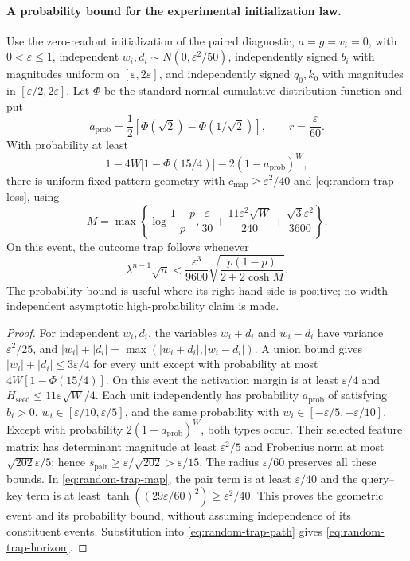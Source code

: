 \paragraph{A probability bound for the experimental initialization law.}
\begin{corollary}
\label{cor:random-trap-geometry}
Use the zero-readout initialization of the paired diagnostic, $a=g=v_i=0$, with $0<\varepsilon\le1$,
independent $w_i,d_i\sim N(0,\varepsilon^2/50)$, independently signed
$b_i$ with magnitudes uniform on $[\varepsilon,2\varepsilon]$, and independently
signed $q_0,k_0$ with magnitudes in $[\varepsilon/2,2\varepsilon]$.
Let $\Phi$ be the standard normal cumulative distribution function and put
\[
 a_{\mathrm{prob}}=\frac12\left[\Phi(\sqrt2)-\Phi(1/\sqrt2)\right],
 \qquad r=\frac\varepsilon{60}.
\]
With probability at least
\begin{equation}
 1-4W\bigl[1-\Phi(15/4)\bigr]-2(1-a_{\mathrm{prob}})^W,
 \label{eq:random-trap-probability}
\end{equation}
there is uniform fixed-pattern geometry with
$c_{\mathrm{map}}\ge\varepsilon^2/40$ and \cref{eq:random-trap-loss}, using
\[
 M=\max\left\{\log\frac{1-p}{p},
 \frac\varepsilon{30}+\frac{11\varepsilon^2\sqrt W}{240}
                   +\frac{\sqrt3\varepsilon^2}{3600}\right\}.
\]
On this event, the outcome trap follows whenever
\begin{equation}
 \lambda^{n-1}\sqrt n
 <\frac{\varepsilon^3}{9600}
   \sqrt{\frac{p(1-p)}{2+2\cosh M}}.
 \label{eq:random-trap-horizon}
\end{equation}
The probability bound is useful where its right-hand side is positive;
no width-independent asymptotic high-probability claim is made.
\end{corollary}
\begin{proof}
For independent $w_i,d_i$, the variables $w_i+d_i$ and $w_i-d_i$ have variance
$\varepsilon^2/25$, and $|w_i|+|d_i|=\max(|w_i+d_i|,|w_i-d_i|)$.
A union bound gives $|w_i|+|d_i|\le3\varepsilon/4$ for every unit except with
probability at most $4W[1-\Phi(15/4)]$. On this event the activation margin is
at least $\varepsilon/4$ and $H_{\mathrm{seed}}\le11\varepsilon\sqrt W/4$.
Each unit independently has probability $a_{\mathrm{prob}}$ of satisfying
$b_i>0$, $w_i\in[\varepsilon/10,\varepsilon/5]$, and the same probability with
$w_i\in[-\varepsilon/5,-\varepsilon/10]$.
Except with probability $2(1-a_{\mathrm{prob}})^W$, both types occur.
Their selected feature matrix has determinant magnitude at least
$\varepsilon^2/5$ and Frobenius norm at most $\sqrt{202}\varepsilon/5$;
hence $s_{\mathrm{pair}}\ge\varepsilon/\sqrt{202}>\varepsilon/15$.
The radius $\varepsilon/60$ preserves all these bounds. In
\cref{eq:random-trap-map}, the pair term is at least $\varepsilon/40$ and the
query--key term is at least $\tanh((29\varepsilon/60)^2)\ge\varepsilon^2/40$.
This proves the geometric event and its probability bound, without assuming
independence of its constituent events. Substitution into \cref{eq:random-trap-path}
gives \cref{eq:random-trap-horizon}.
\end{proof}

